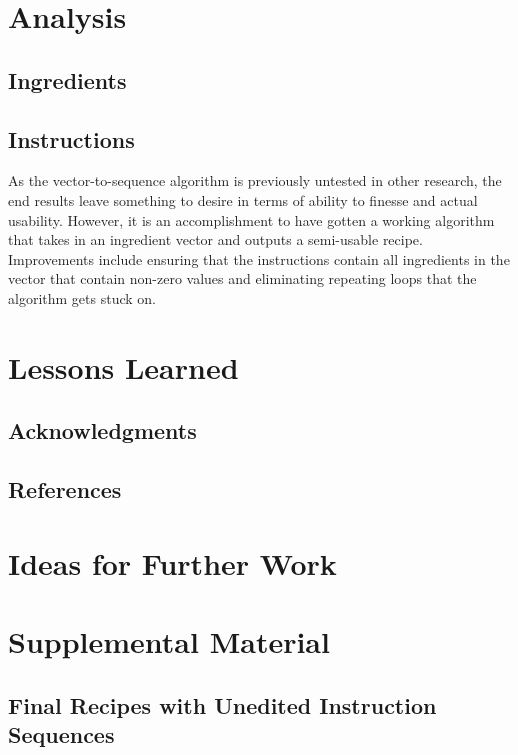 \documentclass[11pt, a4paper]{article}
\begin{document}
		\section{Analysis}	
		\subsection{Ingredients}
		\subsection{Instructions}
		As the vector-to-sequence algorithm is previously untested in other research, the end results leave something to desire in terms of ability to finesse and actual usability. However, it is an accomplishment to have gotten a working algorithm that takes in an ingredient vector and outputs a semi-usable recipe. Improvements include ensuring that the instructions contain all ingredients in the vector that contain non-zero values and eliminating repeating loops that the algorithm gets stuck on.
		\section{Lessons Learned}
		\subsection*{Acknowledgments}
		\subsection*{References}
		\section{Ideas for Further Work}
		\section{Supplemental Material}
		\subsection{Final Recipes with Unedited Instruction Sequences}
\end{document}
